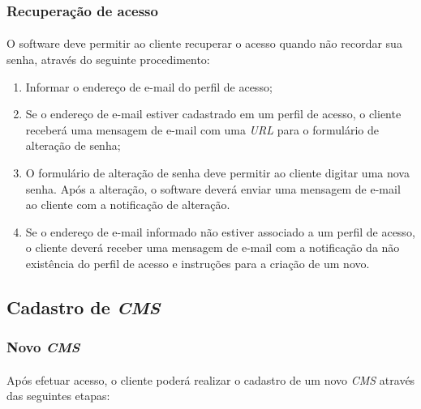 \documentclass[a4paper,12pt]{article}
\def\cms{\emph{CMS}}
\def\url{\emph{URL}}
\begin{document}
\subsubsection{Recuperação de acesso}

\paragraph{}
O software deve permitir ao cliente recuperar o acesso quando não recordar sua
senha, através do seguinte procedimento:

\begin{enumerate}

\item Informar o endereço de e-mail do perfil de acesso;

\item Se o endereço de e-mail estiver cadastrado em um perfil de acesso, o
cliente receberá uma mensagem de e-mail com uma \url{} para o formulário de
alteração de senha;

\item O formulário de alteração de senha deve permitir ao cliente digitar uma
nova senha. Após a alteração, o software deverá enviar uma mensagem de e-mail
ao cliente com a notificação de alteração.

\item Se o endereço de e-mail informado não estiver associado a um perfil de
acesso, o cliente deverá receber uma mensagem de e-mail com a notificação da
não existência do perfil de acesso e instruções para a criação de um novo.

\end{enumerate}

\subsection{Cadastro de \cms{}}

\subsubsection{Novo \cms{}}

\paragraph{}
Após efetuar acesso, o cliente poderá realizar o cadastro de um novo \cms{}
através das seguintes etapas:
\end{document}

